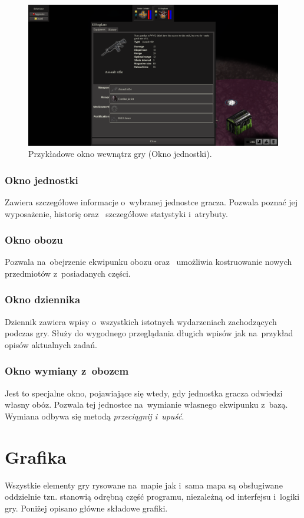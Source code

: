 \documentclass[licencjacka]{pracamgr}
\begin{document}
      \begin{figure}[htbp]
	\centering
	\includegraphics[scale=0.22]{Window.png}
	\caption{Przykładowe okno wewnątrz gry (Okno jednostki).}
      \end{figure}

      \subsubsection{Okno jednostki}
	Zawiera szczegółowe informacje o~wybranej jednostce gracza. Pozwala poznać jej wyposażenie, historię oraz~ szczegółowe statystyki i~atrybuty.
      \subsubsection{Okno obozu}
	Pozwala na~obejrzenie ekwipunku obozu oraz~ umożliwia kostruowanie nowych przedmiotów z~posiadanych części.
      \subsubsection{Okno dziennika}
	Dziennik zawiera wpisy o~wszystkich istotnych wydarzeniach zachodzących podczas gry. Służy do wygodnego przeglądania długich wpisów jak na~przykład
	opisów aktualnych zadań.
      \subsubsection{Okno wymiany z~obozem}
	Jest to specjalne okno, pojawiające się wtedy, gdy jednostka gracza odwiedzi własny obóz. Pozwala tej jednostce na~wymianie własnego ekwipunku z~bazą.
	Wymiana odbywa się metodą \emph{przeciągnij i~upuść}.


  \section{Grafika}
    Wszystkie elementy gry rysowane na~mapie jak i~sama mapa są obsługiwane oddzielnie tzn. stanowią odrębną część programu, niezależną od interfejsu i~logiki gry.
    Poniżej opisano główne składowe grafiki.
\end{document}
